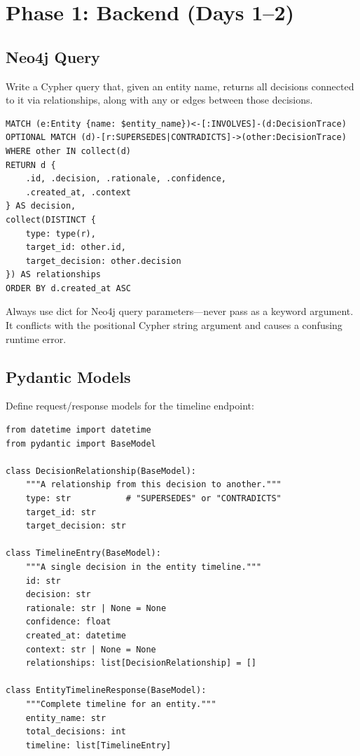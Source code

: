 \section{Phase 1: Backend (Days 1--2)}
\label{sec:starter-backend}

\subsection{Neo4j Query}

Write a Cypher query that, given an entity name, returns all decisions
connected to it via  relationships, along with any
 or  edges between those decisions.

\begin{lstlisting}[style=cypher, title=Entity timeline query]
MATCH (e:Entity {name: $entity_name})<-[:INVOLVES]-(d:DecisionTrace)
OPTIONAL MATCH (d)-[r:SUPERSEDES|CONTRADICTS]->(other:DecisionTrace)
WHERE other IN collect(d)
RETURN d {
    .id, .decision, .rationale, .confidence,
    .created_at, .context
} AS decision,
collect(DISTINCT {
    type: type(r),
    target_id: other.id,
    target_decision: other.decision
}) AS relationships
ORDER BY d.created_at ASC
\end{lstlisting}

\begin{warning}
Always use  dict for Neo4j query parameters---never
pass  as a keyword argument.  It conflicts with the positional
Cypher string argument and causes a confusing runtime error.
\end{warning}

\subsection{Pydantic Models}

Define request/response models for the timeline endpoint:

\begin{lstlisting}[style=python, title=Timeline data models]
from datetime import datetime
from pydantic import BaseModel

class DecisionRelationship(BaseModel):
    """A relationship from this decision to another."""
    type: str           # "SUPERSEDES" or "CONTRADICTS"
    target_id: str
    target_decision: str

class TimelineEntry(BaseModel):
    """A single decision in the entity timeline."""
    id: str
    decision: str
    rationale: str | None = None
    confidence: float
    created_at: datetime
    context: str | None = None
    relationships: list[DecisionRelationship] = []

class EntityTimelineResponse(BaseModel):
    """Complete timeline for an entity."""
    entity_name: str
    total_decisions: int
    timeline: list[TimelineEntry]
\end{lstlisting}

